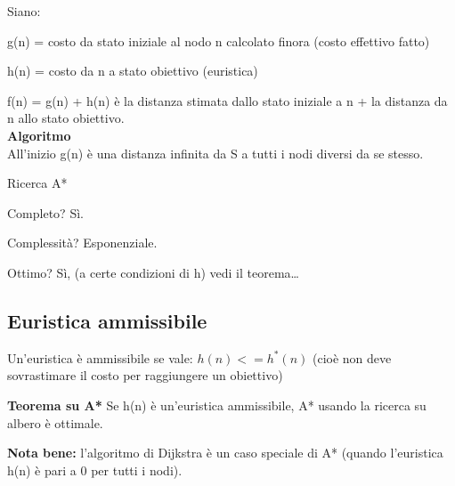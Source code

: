 Siano:

g(n) = costo da stato iniziale al nodo n calcolato finora (costo effettivo fatto)

h(n) = costo da n a stato obiettivo (euristica)

f(n) = g(n) + h(n) è la distanza stimata dallo stato iniziale a n + la distanza
da n allo stato obiettivo.\\

\textbf{Algoritmo}\\

All'inizio g(n) è una distanza infinita da S a tutti i nodi diversi da se
stesso.

\begin{algorithm}[H]
    \caption{Ricerca A*}
    \label{alg:algA}
    \begin{algorithmic}[1]
            \State{
            \[
             g(n) = 
              \begin{cases} 
               \infty & \text{if } n \neq S \\
               0    & \text{if } n = S
              \end{cases}
            \]}
              \EndIf
            \EndFor
            \EndWhile
    \end{algorithmic}
\end{algorithm}

Completo? Sì.

Complessità? Esponenziale.

Ottimo? Sì, (a certe condizioni di h) vedi il teorema\dots

\subsection{Euristica ammissibile}

Un'euristica è ammissibile se vale: $h(n) <= h^*(n)$
(cioè non deve sovrastimare il costo per raggiungere un obiettivo)

\textbf{Teorema su A*}
Se h(n) è un'euristica ammissibile,  A* usando la ricerca su albero è ottimale.

\textbf{Nota bene:} l'algoritmo di Dijkstra è un caso speciale di A* (quando
l'euristica h(n) è pari a 0 per tutti i nodi).

